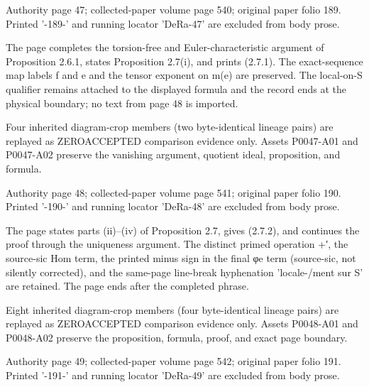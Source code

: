\documentclass[11pt,a4paper]{article}
\begin{document}
\par\medskip
\hypertarget{D018-P0047}{}
\par\smallskip
Authority page 47; collected-paper volume page 540; original paper folio 189. Printed '-189-' and running locator 'DeRa-47' are excluded from body prose.

The page completes the torsion-free and Euler-characteristic argument of Proposition 2.6.1, states Proposition 2.7(i), and prints (2.7.1). The exact-sequence map labels f and e and the tensor exponent on m(e) are preserved. The local-on-S qualifier remains attached to the displayed formula and the record ends at the physical boundary; no text from page 48 is imported.

Four inherited diagram-crop members (two byte-identical lineage pairs) are replayed as ZERO\textunderscore{}ACCEPTED comparison evidence only. Assets P0047-A01 and P0047-A02 preserve the vanishing argument, quotient ideal, proposition, and formula.


\par\medskip
\hypertarget{D018-P0048}{}
\par\smallskip
Authority page 48; collected-paper volume page 541; original paper folio 190. Printed '-190-' and running locator 'DeRa-48' are excluded from body prose.

The page states parts (ii)--(iv) of Proposition 2.7, gives (2.7.2), and continues the proof through the uniqueness argument. The distinct primed operation +′, the source-sic Hom term, the printed minus sign in the final φ\textunderscore{}e term (source-sic, not silently corrected), and the same-page line-break hyphenation 'locale-/ment sur S' are retained. The page ends after the completed phrase.

Eight inherited diagram-crop members (four byte-identical lineage pairs) are replayed as ZERO\textunderscore{}ACCEPTED comparison evidence only. Assets P0048-A01 and P0048-A02 preserve the proposition, formula, proof, and exact page boundary.


\par\medskip
\hypertarget{D018-P0049}{}
\par\smallskip
Authority page 49; collected-paper volume page 542; original paper folio 191. Printed '-191-' and running locator 'DeRa-49' are excluded from body prose.
\end{document}
